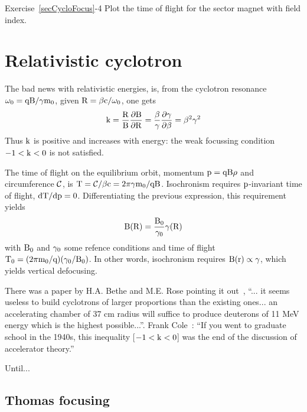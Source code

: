 \smallskip
\noindent {\small $\bullet$} Exercise~\ref{secCycloFocus}-4
Plot the time of flight for  the sector magnet with field index. 





\section{Relativistic cyclotron \label{secCycloRel}}

The bad news with relativistic energies, is, 
from the cyclotron resonance $\rm \omega_0 = qB/\gamma m_0$, given $\rm R = \beta c / \omega_0$,  one gets 
\begin{equation} \rm
\label{EqCycloReson}
  k = \frac{R}{B}\frac{\partial B}{\partial R} = \frac{\beta}{\gamma} 
  \frac{\partial \gamma}{\partial \beta} = \beta^2 \gamma^2 
\end{equation}
Thus $\rm k$ is positive and increases with energy: 
 the weak focussing condition $\rm -1<k<0$ is not satisfied. 

The time of flight on the equilibrium orbit, momentum $\rm p = qB\rho$ and circumference $\rm \mathcal{C}$, is 
$\rm T =  \mathcal{C}/ \beta c = 2\pi \gamma m_0 / qB$. 
    Isochronism requires $\rm p$-invariant time of flight, $\rm dT/dp=0$. Differentiating the previous expression,
this requirement yields 
\begin{equation} \rm
\label{EqCycloBgamma}
B(R) = \frac{B_0}{\gamma_0} \gamma(R)
\end{equation}
with $\rm B_0$ and $\rm \gamma_0$  some refence conditions and time of flight $\rm T_0 = (2\pi m_0/q)(\gamma_0/B_0)$.
In other words, isochronism requires $\rm  B(r) \propto \gamma$, which yields vertical defocusing. 

There was a paper by H.A. Bethe and M.E. Rose pointing it out~\cite{BetheRose}, 
``... it seems useless to build cyclotrons of larger proportions than the  
existing ones... an accelerating chamber of 37 cm radius will  suffice to 
produce deuterons of 11 MeV energy which is the highest possible...''. 
Frank Cole~: ``If you went to graduate school in the 1940s, this inequality [$\rm -1 <k < 0$] 
was the end of the discussion of accelerator theory.''

  Until...

\subsection{Thomas focusing}

